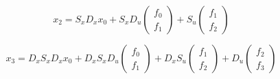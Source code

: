 \documentclass[10pt,a4paper]{article}
\begin{document}
\begin{equation}
x_2=
S_xD_xx_0+
S_xD_u\begin{pmatrix} f_0 \\ f_1 \end{pmatrix}+
S_u\begin{pmatrix} f_1 \\ f_2 \end{pmatrix}
\end{equation}

\begin{equation}
x_3=
D_xS_xD_xx_0+
D_xS_xD_u\begin{pmatrix} f_0 \\ f_1 \end{pmatrix}+
D_xS_u\begin{pmatrix} f_1 \\ f_2 \end{pmatrix}+
D_u\begin{pmatrix} f_2 \\ f_3 \end{pmatrix}
\end{equation}
\end{document}
